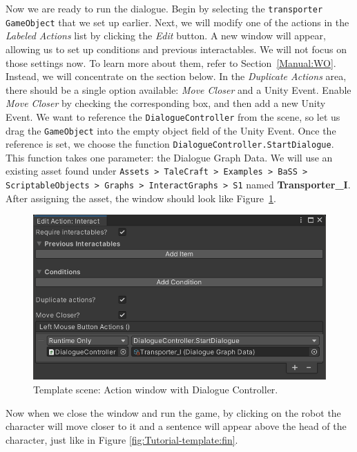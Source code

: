Now we are ready to run the dialogue. Begin by selecting the \texttt{transporter} \texttt{GameObject} that we set up earlier. Next, we will modify one of the actions in the \textit{Labeled Actions} list by clicking the \textit{Edit} button. A new window will appear, allowing us to set up conditions and previous interactables. We will not focus on those settings now. To learn more about them, refer to Section~\ref{Manual:WO}. Instead, we will concentrate on the section below. In the \textit{Duplicate Actions} area, there should be a single option available: \textit{Move Closer} and a Unity Event. Enable \textit{Move Closer} by checking the corresponding box, and then add a new Unity Event. We want to reference the \texttt{DialogueController} from the scene, so let us drag the \texttt{GameObject} into the empty object field of the Unity Event. Once the reference is set, we choose the function \texttt{DialogueController.StartDialogue}. This function takes one parameter: the Dialogue Graph Data. We will use an existing asset found under \texttt{Assets > TaleCraft > Examples > BaSS > ScriptableObjects > Graphs > InteractGraphs > S1} named \textbf{Transporter\_I}. After assigning the asset, the window should look like Figure~\ref{fig:Tutorial-template:AW+DC}.

\begin{figure}[H]
\centering
\includegraphics[width=0.75\linewidth]{img/User doc/image_2025-07-09_112421422.png}
\caption{Template scene: Action window with Dialogue Controller.}
\label{fig:Tutorial-template:AW+DC}
\end{figure}

Now when we close the window and run the game, by clicking on the robot the character will move closer to it and a sentence will appear above the head of the character, just like in Figure \ref{fig:Tutorial-template:fin}.

